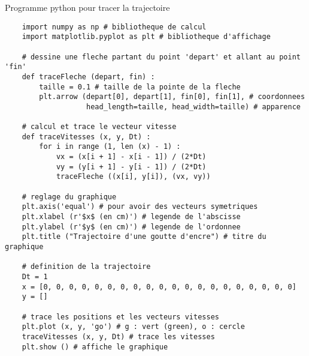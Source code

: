 \newpage
\phantom{b}
\vspace*{-44pt}
\begin{doc}{Programme python pour tracer la trajectoire}
  \label{doc:code_python}
  \vspace*{-20pt}
  \lstset{style=codePython, language=python}
  \begin{lstlisting}
    import numpy as np # bibliotheque de calcul
    import matplotlib.pyplot as plt # bibliotheque d'affichage
    
    # dessine une fleche partant du point 'depart' et allant au point 'fin'
    def traceFleche (depart, fin) :
        taille = 0.1 # taille de la pointe de la fleche
        plt.arrow (depart[0], depart[1], fin[0], fin[1], # coordonnees
                   head_length=taille, head_width=taille) # apparence
    
    # calcul et trace le vecteur vitesse
    def traceVitesses (x, y, Dt) :
        for i in range (1, len (x) - 1) :
            vx = (x[i + 1] - x[i - 1]) / (2*Dt)
            vy = (y[i + 1] - y[i - 1]) / (2*Dt)
            traceFleche ((x[i], y[i]), (vx, vy))
    
    # reglage du graphique
    plt.axis('equal') # pour avoir des vecteurs symetriques
    plt.xlabel (r'$x$ (en cm)') # legende de l'abscisse
    plt.ylabel (r'$y$ (en cm)') # legende de l'ordonnee
    plt.title ("Trajectoire d'une goutte d'encre") # titre du graphique
    
    # definition de la trajectoire
    Dt = 1
    x = [0, 0, 0, 0, 0, 0, 0, 0, 0, 0, 0, 0, 0, 0, 0, 0, 0, 0, 0, 0]
    y = []
    
    # trace les positions et les vecteurs vitesses
    plt.plot (x, y, 'go') # g : vert (green), o : cercle
    traceVitesses (x, y, Dt) # trace les vitesses
    plt.show () # affiche le graphique\end{lstlisting}
  \vspace*{-8pt}
\end{doc}






